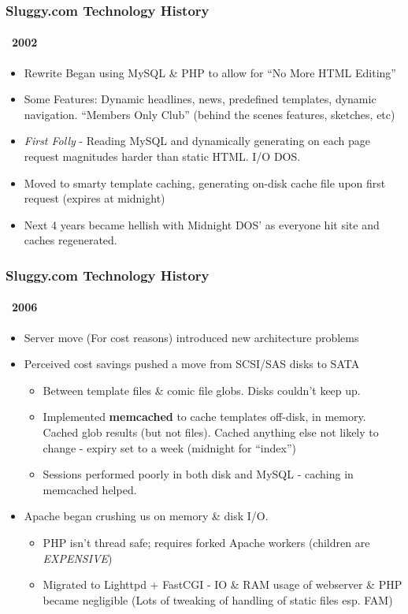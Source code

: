 \documentclass{beamer}
\begin{document}
\begin{frame}
\frametitle{Sluggy.com Technology History}
\framesubtitle{~2002}
	\begin{itemize}
		\item Rewrite Began using MySQL \& PHP to allow for ``No More HTML Editing''
		\item Some Features: Dynamic headlines, news, predefined templates, dynamic navigation.  ``Members Only Club'' (behind the scenes features, sketches, etc)
		\item {\em First Folly} - Reading MySQL and dynamically generating on each page request magnitudes harder than static HTML.  I/O DOS.
		\item Moved to smarty template caching, generating on-disk cache file upon first request (expires at midnight)
		\item Next 4 years became hellish with Midnight DOS' as everyone hit site and caches regenerated.
	\end{itemize}
\end{frame}
\begin{frame}
\frametitle{Sluggy.com Technology History}
\framesubtitle{~2006}
	\begin{itemize}
		\item Server move (For cost reasons) introduced new architecture problems
		\item Perceived cost savings pushed a move from SCSI/SAS disks to SATA
			\begin{itemize}
				\item Between template files \& comic file globs.  Disks couldn't keep up.
				\item Implemented {\bf memcached} to cache templates off-disk, in memory.  Cached glob results (but not files).  Cached anything else not likely to change - expiry set to a week (midnight for ``index'')
				\item Sessions performed poorly in both disk and MySQL - caching in memcached helped.
			\end{itemize}
		\item Apache began crushing us on memory \& disk I/O.
			\begin{itemize}
				\item PHP isn't thread safe; requires forked Apache workers (children are {\em EXPENSIVE})
				\item Migrated to Lighttpd + FastCGI - IO \& RAM usage of webserver \& PHP became negligible (Lots of tweaking of handling of static files esp. FAM)
			\end{itemize}
	\end{itemize}
\end{frame}
\end{document}
